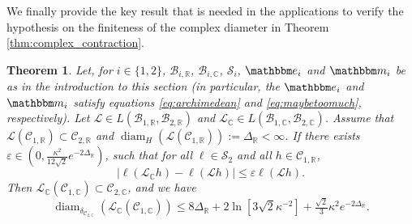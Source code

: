 \documentclass{amsart}
\numberwithin{equation}{section}
\newtheorem{thm}{Theorem}[section]
\newcommand\cB{{\mathcal B}}
\newcommand\cC{{\mathcal C}}
\newcommand\cL{{\mathcal L}}
\newcommand\cS{{\mathcal S}}
\newcommand\bC{{\mathbb C}}
\newcommand\bR{{\mathbb R}}
\newcommand\ve{\varepsilon}
\newcommand{\bbe}{\mathbbm e}
\newcommand{\bbm}{\mathbbm m}
\newcommand{\diam}{\operatorname{diam}}
\begin{document}
We finally provide the key result that is needed in the applications to verify the hypothesis on the finiteness of the complex diameter in Theorem \ref{thm:complex_contraction}.
\begin{thm} \label{thm:needed} 
Let, for $i\in\{1,2\}$, $\cB_{i,\bR}$, $\cB_{i,\bC}$, $\cS_i$, $\bbe_i$ and $\bbm_i$ be as in the introduction to this section (in particular, the $\bbe_i$ and $\bbm_i$ satisfy equations \eqref{eq:archimedean} and \eqref{eq:maybetoomuch}, respectively).
Let $\cL\in L(\cB_{1,\bR},\cB_{2,\bR})$ and $\cL_\bC\in L(\cB_{1,\bC},\cB_{2,\bC})$.
Assume that $\cL(\cC_{1,\bR})\subset \cC_{2,\bR}$ and $\diam_H(\cL(\cC_{1,\bR})):=\Delta_\bR<\infty$. 
If there exists $\ve \in (0, \frac{\kappa^2}{12 \sqrt 2}e^{-2\Delta_\bR})$, such that
for all $\ell \in \cS_2$ and all $h \in \cC_{1,\bR}$,
\begin{equation}\label{eq:complex_bound}
\left|\ell(\cL_{\bC} h)-\ell(\cL h)\right|\leq \ve \ell(\cL h).
\end{equation}
Then $\cL_{\bC}(\cC_{1,\bC})\subset \cC_{2,\bC}$, and we have
\[
\diam_{\delta_{\cC_{2, \bC}}} (\cL_{\bC}(\cC_{1,\bC}))\leq 8\Delta_\bR +
 2 \ln[3\sqrt 2\kappa^{-2}]+ \tfrac{\sqrt{2}}{3} \kappa^2e^{-2\Delta_\bR} . 
\]
\end{thm}
\end{document}
